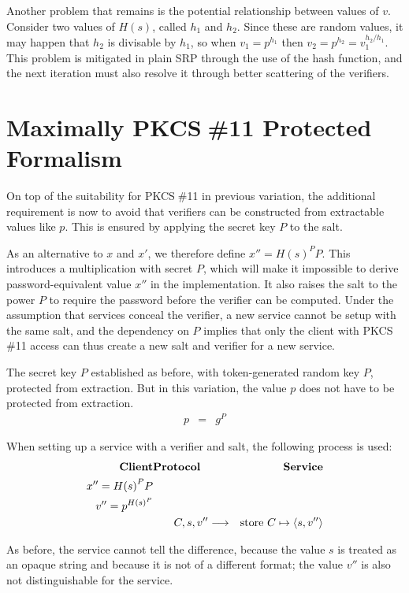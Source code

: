 \documentclass[a4paper,11pt]{article}
\def\pkcs11{PKCS$\;$\#11\xspace}
\def\tor#1{\phantom{\longleftarrow\strut}#1\strut\longrightarrow}
\begin{document}
Another problem that remains is the potential relationship between values of $v$.  Consider two values of $H(s)$, called $h_1$ and $h_2$.  Since these are random values, it may happen that $h_2$ is divisable by $h_1$, so when $v_1=p^{h_1}$ then $v_2=p^{h_2}=v_1^{h_2/h_1}$.  This problem is mitigated in plain SRP through the use of the hash function, and the next iteration must also resolve it through better scattering of the verifiers.

\section{Maximally \pkcs11 Protected Formalism}

On top of the suitability for \pkcs11 in previous variation, the additional requirement is now to avoid that verifiers can be constructed from extractable values like $p$.  This is ensured by applying the secret key $P$ to the salt.

As an alternative to $x$ and $x'$, we therefore define $x''={H(s)}^P P$.  This introduces a multiplication with secret $P$, which will make it impossible to derive password-equivalent value $x''$ in the implementation.  It also raises the salt to the power $P$ to require the password before the verifier can be computed.  Under the assumption that services conceal the verifier, a new service cannot be setup with the same salt, and the dependency on $P$ implies that only the client with \pkcs11 access can thus create a new salt and verifier for a new service.

The secret key $P$ established as before, with token-generated random key $P$, protected from extraction.  But in this variation, the value $p$ does not have to be protected from extraction.
%
\begin{eqnarray*}
p &=& g^P
\end{eqnarray*}

When setting up a service with a verifier and salt, the following process is used:
%
\begin{eqnarray*}
\textbf{Client}&\textbf{Protocol}&\textbf{Service}\\
x''={H(s)}^P P&&\\
v''=p^{{H(s)}^P}&&\\
&\tor{C,s,v''}&\textrm{store $C\mapsto\langle s,v''\rangle$}
\end{eqnarray*}

As before, the service cannot tell the difference, because the value $s$ is treated as an opaque string and because it is not of a different format; the value $v''$ is also not distinguishable for the service.
\end{document}
